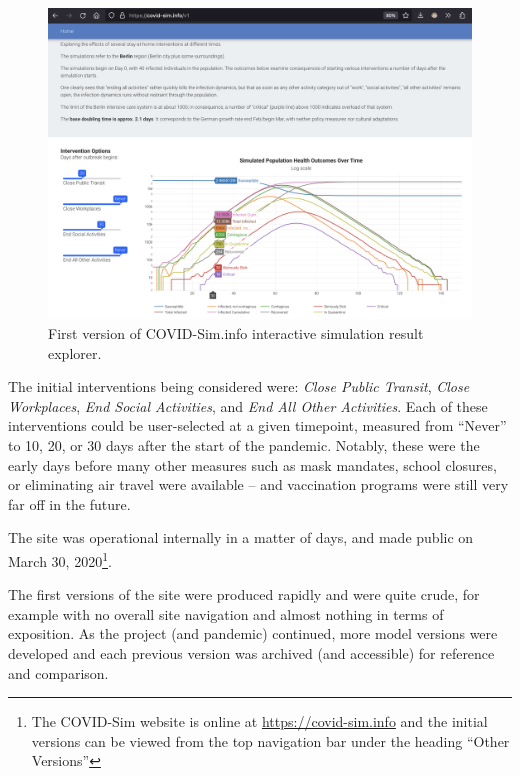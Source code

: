 \begin{figure}
  \centering
	\begin{minipage}{0.8\textwidth}
    \includegraphics[width=\textwidth]{chapters/21-covid-sim/images/covid-v1.png}
  \caption{First version of COVID-Sim.info interactive simulation result explorer.}
  \label{fig:covid-v1}
	\end{minipage}
\end{figure}

The initial interventions being considered were: \emph{Close Public Transit}, \emph{Close Workplaces}, \emph{End Social Activities}, and \emph{End All Other Activities}. Each of these interventions could be user-selected at a given timepoint, measured from ``Never'' to 10, 20, or 30 days after the start of the pandemic. Notably, these were the early days before many other measures such as mask mandates, school closures, or eliminating air travel were available -- and vaccination programs were still very far off in the future.

The site was operational internally in a matter of days, and made public on March 30, 2020\footnote{The COVID-Sim website is online at \url{https://covid-sim.info} and the initial versions can be viewed from the top navigation bar under the heading ``Other Versions''}.

The first versions of the site were produced rapidly and were quite crude, for example with no overall site navigation and almost nothing in terms of exposition. As the project (and pandemic) continued, more model versions were developed and each previous version was archived (and accessible) for reference and comparison.

